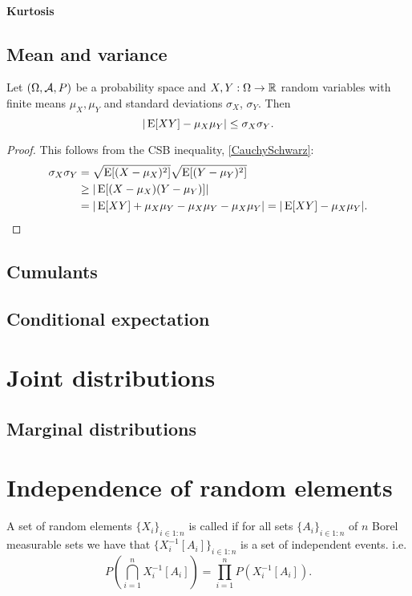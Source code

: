 \paragraph{Kurtosis}

\subsection{Mean and variance}

\begin{proposition}
Let $\left( \Omega, \mathcal{A}, P \right)$ be a probability space and $X,Y:\Omega \to \mathbb{R}$ random variables with finite means $\mu_X,\mu_Y$ and standard deviations $\sigma_X$, $\sigma_Y$. Then
\[ |\operatorname{E}[XY] - \mu_X\mu_Y| \leq \sigma_X\sigma_Y. \]
\end{proposition}
\begin{proof}
This follows from the CSB inequality, \ref{CauchySchwarz}:
\begin{align*}
\sigma_X\sigma_Y &= \sqrt{\operatorname{E}[(X-\mu_X)^2]}\sqrt{\operatorname{E}[(Y-\mu_Y)^2]} \\
&\geq |\operatorname{E}[(X-\mu_X)(Y-\mu_Y)]| \\
&= |\operatorname{E}[XY] + \mu_X\mu_Y -\mu_X\mu_Y -\mu_X\mu_Y| = |\operatorname{E}[XY] - \mu_X\mu_Y|.
\end{align*}
\end{proof}

\subsection{Cumulants}

\subsection{Conditional expectation}

\section{Joint distributions}
\subsection{Marginal distributions}

\section{Independence of random elements}
\begin{definition}
A set of random elements $\{X_i\}_{i\in 1:n}$ is called  if for all sets $\{A_i\}_{i\in 1:n}$ of $n$ Borel measurable sets we have that $\{X_i^{-1}[A_i]\}_{i\in 1:n}$ is a set of independent events. i.e.
\[ P\left(\bigcap_{i=1}^n X_i^{-1}[A_i]\right) = \prod_{i=1}^n P(X_i^{-1}[A_i]). \]
\end{definition}


